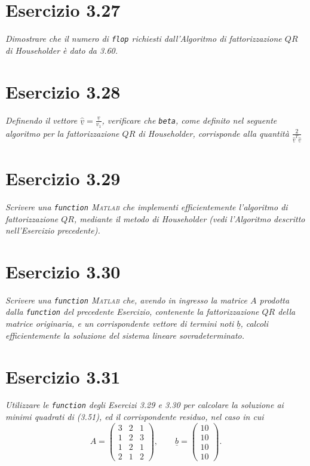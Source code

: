 \section{Esercizio 3.27}
\emph{Dimostrare che il numero di \texttt{flop} richiesti dall'Algoritmo di fattorizzazione $QR$ di Householder è dato da 3.60.}
\section{Esercizio 3.28}
\emph{Definendo il vettore $\underline{\hat{v}}=\frac{\underline{v}}{v_1}$, verificare che \lstinline{beta}, come definito nel seguente algoritmo per la fattorizzazione $QR$ di Householder, corrisponde alla quantità $\frac{2}{\underline{\hat{v}}^T\underline{\hat{v}}}$}
\section{Esercizio 3.29}
\emph{Scrivere una \lstinline{function} \textsc{Matlab} che implementi efficientemente l'algoritmo di fattorizzazione $QR$, mediante il metodo di Householder (vedi l'Algoritmo descritto nell'Esercizio precedente).}
\section{Esercizio 3.30}
\emph{Scrivere una \lstinline{function} \textsc{Matlab} che, avendo in ingresso la matrice $A$ prodotta dalla \lstinline{function} del precedente Esercizio, contenente la fattorizzazione $QR$ della matrice originaria, e un corrispondente vettore di termini noti $\underline{b}$, calcoli efficientemente la soluzione del sistema lineare sovradeterminato.}
\section{Esercizio 3.31}
\emph{Utilizzare le \lstinline{function} degli Esercizi 3.29 e 3.30 per calcolare la soluzione ai minimi quadrati di (3.51), ed il corrispondente residuo, nel caso in cui}
\[
  A=
  \begin{pmatrix}
    3 & 2 & 1\\
    1 & 2 & 3\\
    1 & 2 & 1\\
    2 & 1 & 2
  \end{pmatrix},
  \qquad \underline{b}=
  \begin{pmatrix}
    10\\
    10\\
    10\\
    10
  \end{pmatrix}.
\]

